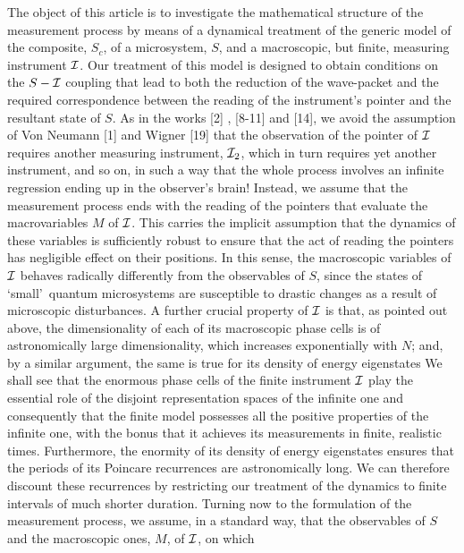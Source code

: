 \vskip 0.2cm
The object of this article is to investigate the mathematical structure of the measurement 
process by means of a dynamical treatment of the generic model of the composite, 
$S_{c}$, of  a microsystem, $S$, and a macroscopic, but finite, measuring instrument 
${\cal I}$. Our treatment of this model is designed to obtain conditions on the $S-{\cal 
I}$ coupling that lead to both the reduction of the wave-packet and the required 
correspondence between the reading of the instrument\rq s pointer and the resultant state 
of $S$.  As in the works [2] , [8-11]  and [14], we avoid the assumption of Von Neumann 
[1] and Wigner [19] that the observation of  the pointer of ${\cal I}$ requires another 
measuring instrument,  ${\cal I}_{2}$, which in turn requires yet another instrument, and 
so on, in such a way that the whole process involves an infinite regression ending up in 
the observer\rq s brain! Instead, we assume that the measurement  process ends with the 
reading of the pointers that evaluate the  macrovariables $M$ of ${\cal I}$. This carries 
the implicit assumption that the dynamics of these variables is sufficiently robust to 
ensure that the act of reading the pointers has negligible effect on their positions. In this 
sense, the macroscopic variables of ${\cal I}$ behaves radically differently from the 
observables of $S$, since the states of  \lq small\rq\ quantum microsystems are 
susceptible to drastic changes as a result of microscopic disturbances. A further crucial 
property of  ${\cal I}$ is that, as pointed out above, the dimensionality of each of its 
macroscopic phase cells is of astronomically large dimensionality, which increases 
exponentially with $N$; and, by a similar argument, the same is true for its density of 
energy eigenstates We shall see that the enormous phase cells of the finite instrument 
${\cal I}$ play the essential role of the disjoint representation spaces of the infinite one 
and consequently that the finite model possesses all the positive properties of the infinite 
one, with the bonus that it achieves its measurements in finite, realistic times. 
Furthermore, the enormity of its density of energy eigenstates ensures that the periods of 
its Poincare recurrences are astronomically long. We can therefore discount these 
recurrences by restricting our treatment of the dynamics to finite intervals of much 
shorter duration.
\vskip 0.2cm
Turning now to the formulation of the measurement process, we assume, in a standard 
way, that the observables of $S$ and the macroscopic ones, $M$, of  ${\cal I}$, on which 

